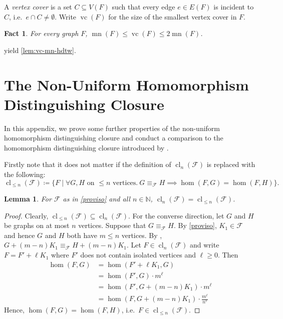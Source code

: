 \documentclass[11pt, DIV=15]{scrarticle}
\theoremstyle{definition}
\theoremstyle{plain}
\newtheorem{lemma}[definition]{Lemma}
\newtheorem{fact}[definition]{Fact}
\theoremstyle{remark}
\DeclareMathOperator{\mn}{mn}
\DeclareMathOperator{\vc}{vc}
\DeclareMathOperator{\cl}{cl}
\begin{document}
	
	A \emph{vertex cover} is a set $C \subseteq V(F)$ such that every edge $e \in E(F)$ is incident to $C$, i.e.\ $e \cap C \neq \emptyset$.
	Write $\vc(F)$ for the size of the smallest vertex cover in $F$.
	
	\begin{fact} \label{fact:mn-vc}
		For every graph $F$, $\mn(F) \leq \vc(F) \leq 2\mn(F)$.
	\end{fact}
	
	 yield \cref{lem:vc-mn-hdtw}.
	
	\section{The Non-Uniform Homomorphism Distinguishing Closure}
	\label{app:cl}
	
	In this appendix, we prove some further properties of the non-uniform homomorphism distinguishing closure and conduct a comparison to the homomorphism distinguishing closure introduced by \textcite{roberson_oddomorphisms_2022}.
	
	Firstly note that it does not matter if the definition of $\cl_n(\mathcal{F})$ is replaced with the following:
	\[
	\cl_{\leq n}(\mathcal{F}) \coloneqq \{F \mid \forall G, H \text{ on $\leq n$ vertices}.\ G \equiv_{\mathcal{F}} H \implies \hom(F, G) = \hom(F, H)\}.
	\]
	
	\begin{lemma}\label{lem:cl-leq}
		For $\mathcal{F}$ as in \cref{proviso} and all $n \in \mathbb{N}$,
		$\cl_n(\mathcal{F}) = \cl_{\leq n}(\mathcal{F})$.
	\end{lemma}
	\begin{proof}
		Clearly,
		$\cl_{\leq n}(\mathcal{F}) \subseteq \cl_n(\mathcal{F})$.
		For the converse direction,
		let $G$ and $H$ be graphs on at most $n$ vertices.
		Suppose that $G \equiv_{\mathcal{F}} H$.
		By \cref{proviso}, $K_1 \in \mathcal{F}$ and hence $G$ and $H$ both have $m \leq n$ vertices.
		By \cite[Theorem~7]{seppelt_logical_2024},
		$G + (m-n)K_1 \equiv_{\mathcal{F}} H + (m-n) K_1$.
		Let $F \in \cl_n(\mathcal{F})$
		and write $F = F' + \ell K_1$ where $F'$ does not contain isolated vertices and $\ell \geq 0$.
		Then
		\begin{align*}
			\hom(F, G) 
			&= \hom(F' + \ell K_1, G)\\
			&= \hom(F', G) \cdot m^\ell \\
			&= \hom(F', G + (m-n)K_1) \cdot m^\ell \\
			&= \hom(F, G + (m-n)K_1) \cdot \frac{m^\ell}{n^\ell}
 		\end{align*}
 		Hence, $\hom(F, G) = \hom(F, H)$, i.e.\
 		$F \in \cl_{\leq n}(\mathcal{F})$.
	\end{proof}
	
\end{document}
